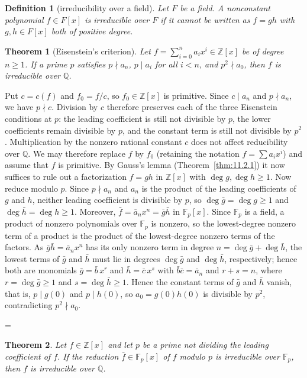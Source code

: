 \documentclass[11pt]{article}
\makeatletter
\theoremstyle{ntstyle}
\newtheorem{theorem}{Theorem}[subsection]
\newtheorem{definition}{Definition}[subsection]
\let\nt@closedisplay\]
\def\nt@guardedclose{\@ifnextchar\par{\nt@closeafterpar}{\@ifnextchar\end{\postdisplaypenalty\@M\nt@closedisplay}{\nt@closedisplay}}}
\def\nt@closeafterpar\par{\@ifnextchar\par{\nt@closeafterpar}{\@ifnextchar\end{\postdisplaypenalty\@M\nt@closedisplay\par}{\nt@closedisplay\par}}}
\renewenvironment{proof}[1][\proofname]{\par
  \pushQED{\qed}\normalfont\topsep\medskipamount\edef\nt@afterproof{\@endparpenalty=\the\@endparpenalty\relax}\@beginparpenalty\@M\@endparpenalty\@M\let\]\nt@guardedclose\trivlist\item[]\textit{#1\@addpunct{.}} \ignorespaces}{\ifvmode\addpenalty\@M\fi\popQED\nt@afterproof\endtrivlist\@endpefalse}
\makeatother
\begin{document}
\begin{definition}[irreducibility over a field]\label{def:11.3.1}
	Let $F$ be a field. A nonconstant polynomial $f\in F[x]$ is
	irreducible over $F$ if it cannot be written as $f=gh$ with
	$g,h\in F[x]$ both of positive degree.

\end{definition}
\begin{theorem}[Eisenstein's criterion]\label{thm:11.3.1} Let $f = \sum_{i=0}^n
		a_i x^i\in\mathbb{Z}[x]$ be of degree $n\ge1$. If a prime $p$ satisfies $p\nmid a_n$,
	$p\mid a_i$ for all $i<n$, and $p^2\nmid a_0$, then $f$ is
	irreducible over $\mathbb{Q}$.

\end{theorem}

\begin{proof} Put $c=c(f)$ and $f_0=f/c$, so $f_0\in\mathbb{Z}[x]$ is
	primitive. Since $c\mid a_n$ and $p\nmid a_n$, we have $p\nmid c$.
	Division by $c$ therefore preserves each of the three Eisenstein
	conditions at $p$: the leading coefficient is still not divisible by $p$,
	the lower coefficients remain divisible by $p$, and the constant term
	is still not divisible by $p^2$. Multiplication by the nonzero rational
	constant $c$ does not affect reducibility over $\mathbb{Q}$. We may
	therefore replace $f$ by $f_0$ (retaining the notation $f=\sum a_i x^i$)
	and assume that $f$ is primitive. By Gauss's lemma
	(Theorem~\ref{thm:11.2.1}) it now suffices to rule out a factorization $f=gh$ in
	$\mathbb{Z}[x]$ with $\deg g,\deg h\ge1$. Now reduce modulo $p$. Since $p\nmid a_n$ and $a_n$ is the product of
	the leading coefficients of $g$ and $h$, neither leading
	coefficient is divisible by $p$, so $\deg\bar g=\deg g\ge1$ and
	$\deg\bar h=\deg h\ge1$. Moreover, $\bar f = \bar a_n x^n = \bar g\bar h$
	in $\mathbb{F}_p[x]$.
	  Since $\mathbb{F}_p$ is a field, a product of nonzero polynomials over $\mathbb{F}_p$ is nonzero, so the lowest-degree nonzero term of a product is the product of the lowest-degree nonzero terms of the factors.
	  As $\bar g\bar h=\bar a_n x^n$ has its only nonzero term in degree $n=\deg\bar g+\deg\bar h$, the lowest terms of $\bar g$ and $\bar h$ must lie in degrees $\deg\bar g$ and $\deg\bar h$, respectively;
	  hence both are monomials $\bar g = \bar b\,x^{r}$ and $\bar h = \bar c\,x^{s}$ with $\bar b\bar c=\bar a_n$
	and $r+s=n$, where $r=\deg\bar g\ge1$ and $s=\deg\bar h\ge1$.
	Hence the constant terms of $\bar g$ and $\bar h$ vanish, that is, $p\mid
		g(0)$ and $p\mid h(0)$, so $a_0 = g(0)h(0)$ is divisible by $p^2$,
	contradicting $p^2\nmid a_0$.

\end{proof}
\begin{theorem}\label{thm:11.3.2} Let $f\in\mathbb{Z}[x]$ and let
	$p$ be a prime not dividing the leading coefficient of $f$. If the
	reduction $\bar f\in\mathbb{F}_p[x]$ of $f$ modulo $p$ is irreducible
	over $\mathbb{F}_p$, then $f$ is irreducible over $\mathbb{Q}$.

\end{theorem}
\end{document}
